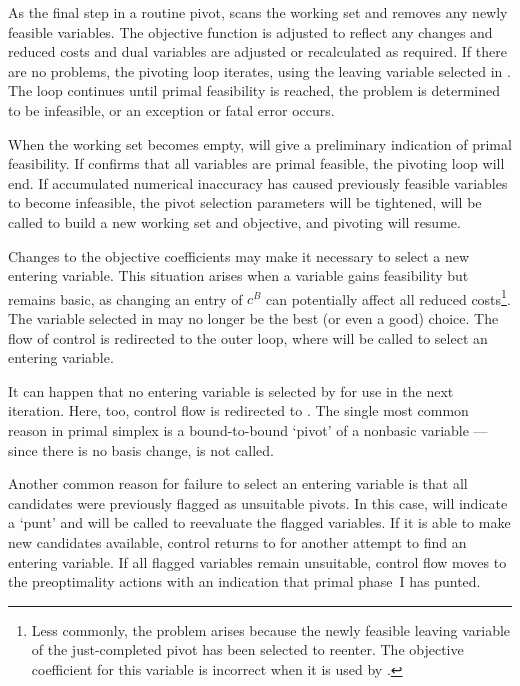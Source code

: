 As the final step in a routine pivot,  scans the
working set and removes any newly feasible variables.
The objective function is adjusted to reflect any changes and
reduced costs and dual variables are adjusted or recalculated as required.
If there are no problems, the pivoting loop iterates, using the leaving
variable selected in .
The loop continues until primal feasibility is reached, the problem
is determined to be infeasible, or an exception or fatal error occurs.

When the working set becomes empty, 
will give a preliminary indication of primal feasibility.
If  confirms that all variables are primal feasible,
the pivoting loop will end.
If accumulated numerical inaccuracy has caused previously feasible variables
to become infeasible, the pivot selection parameters will be tightened, 
 will be called to build a new working
set and objective, and pivoting will resume.

Changes to the objective coefficients may make it necessary
to select a new entering variable.
This situation arises when a variable gains feasibility but remains
basic, as changing an entry of $c^B$ can potentially affect all
reduced costs\footnote{%
Less commonly, the problem arises because the newly feasible leaving variable
of the just-completed pivot has been selected to reenter.
The objective coefficient for this variable is incorrect when it is used
by .}.
The variable selected in  may no longer be the best
(or even a good) choice.
The flow of control is redirected to the outer loop, where 
will be called to select an entering variable.

It can happen that no entering variable is selected by 
for use in the next iteration.
Here, too, control flow is redirected to .
The single most common reason in primal simplex is
a bound-to-bound `pivot' of a nonbasic variable --- since there is no
basis change,  is not called.

Another common reason for failure to select an entering variable is that all
candidates were previously flagged as unsuitable pivots.
In this case,  will indicate a `punt' and
 will be called to reevaluate the flagged variables.
If it is able to make new candidates available, control returns to
 for another attempt to find an entering variable.
If all flagged variables remain unsuitable, control flow moves to the
preoptimality actions with an indication that primal phase~I has punted.

